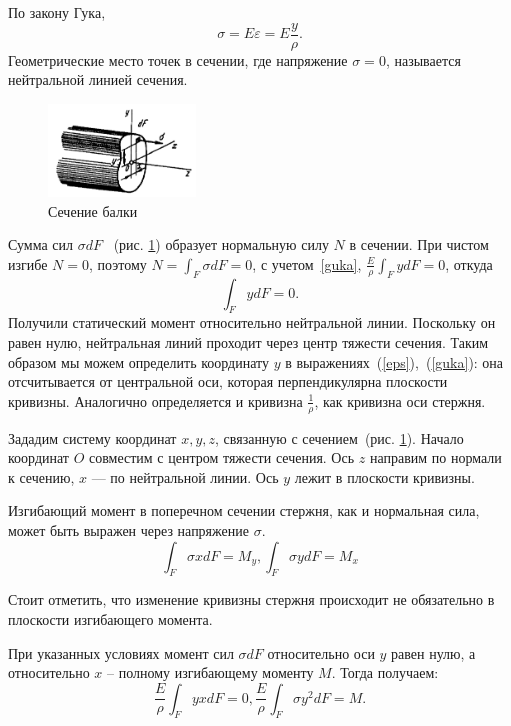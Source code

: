 \documentclass[12pt, a4paper]{article}
\begin{document}
По закону Гука, 
\begin{equation}
	\label{guka}
	\sigma = E \varepsilon = E \frac{y}{\rho}.
\end{equation}
Геометрические место точек в сечении, где напряжение $\sigma = 0$, называется нейтральной линией сечения.
\begin{figure}[!h]
	\centering
	\includegraphics[width=0.35\textwidth]{pic.5}%
	\caption{Сечение балки}
	\vspace*{-2mm}
	\label{pic5}
\end{figure}

Сумма сил $\sigma d F$ ~(рис. \ref{pic5}) образует нормальную силу $N$ в сечении. При чистом изгибе $N = 0$, поэтому $N = \int_{F} \sigma d F = 0$, с учетом~\ref{guka}, $\frac{E}{\rho} \int_{F} y d F = 0$, откуда 
\begin{equation}
	\label{ydF}
	\int_{F} y d F = 0.
\end{equation}
Получили статический момент относительно нейтральной линии. Поскольку он равен нулю, нейтральная линий проходит через центр тяжести сечения. Таким образом мы можем определить координату $y$ в выражениях~(\ref{eps}),~(\ref{guka}): она отсчитывается от центральной оси, которая перпендикулярна плоскости кривизны. Аналогично определяется и кривизна $\frac{1}{\rho}$, как кривизна оси стержня. 

Зададим систему координат $x, y, z$, связанную с сечением~(рис. \ref{pic5}). Начало координат $O$ совместим с центром тяжести сечения. Ось $z$ направим по нормали к сечению, $x$ --- по нейтральной линии. Ось $y$ лежит в плоскости кривизны.

Изгибающий момент в поперечном сечении стержня, как и нормальная сила, может быть выражен через напряжение $\sigma$. 
\begin{equation}
	\label{bendM}
	\int_{F} \sigma x d F = M_y, \int_{F} \sigma y d F = M_x
\end{equation}

Стоит отметить, что изменение кривизны стержня происходит не обязательно в плоскости изгибающего момента.

При указанных условиях момент сил $\sigma d F$ относительно оси $y$ равен нулю, а относительно $x$ -- полному изгибающему моменту $M$. Тогда получаем:
\begin{equation}
	\label{bendM2}
	\frac{E}{\rho} \int_{F} y x d F = 0, \frac{E}{\rho} \int_{F} \sigma y^2 d F = M.
\end{equation}
\end{document}
